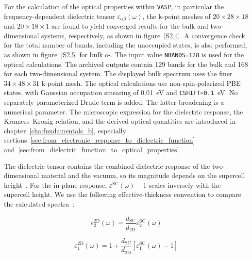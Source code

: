 For the calculation of the optical properties within \texttt{VASP},
in particular the frequency-dependent dielectric tensor $\varepsilon_{\alpha\beta}(\omega)$,
the k-point meshes of $20 \times 28 \times 18$ and $20 \times 18 \times 1$ are found to yield converged results for the bulk and two-dimensional systems,
respectively, as shown in figure~\ref{S2.4}.
A convergence check for the total number of bands, including the unoccupied states, is also performed,
as shown in figure~\ref{S2.5} for bulk o-.
The input value \texttt{NBANDS=128} is used for the optical calculations.
The archived outputs contain 129 bands for the bulk and 168 for each two-dimensional system.
The displayed bulk spectrum uses the finer $34\times48\times31$ k-point mesh.
The optical calculations use non-spin-polarized PBE states,
with Gaussian occupation smearing of \qty{0.01}{\electronvolt} and \texttt{CSHIFT=0.1}~eV.
No separately parameterized Drude term is added.
The latter broadening is a numerical parameter.
The microscopic expression for the dielectric response,
the Kramers--Kronig relation,
and the derived optical quantities are introduced in chapter~\ref{cha:fundamentals_b},
especially sections~\ref{sec:from_electronic_response_to_dielectric_function} and~\ref{sec:from_dielectric_function_to_optical_properties}.

The dielectric tensor contains the combined dielectric response of the two-dimensional material and the vacuum,
so its magnitude depends on the supercell height~\cite{weng2018honeycomb,laturia2018dielectric}.
For the in-plane response, $\varepsilon^{\mathrm{SC}}(\omega)-1$ scales inversely with the supercell height.
We use the following effective-thickness convention to compare the calculated spectra~\cite{yang2021method}:

\begin{equation}
    \varepsilon_{2}^{\mathrm{2D}}(\omega)
    = \frac{d_{\mathrm{SC}}}{d_{\mathrm{2D}}}
    \varepsilon_{2}^{\mathrm{SC}}(\omega)
    \label{dielectric_vacuum_correction_imaginary}
\end{equation}

\begin{equation}
    \varepsilon_{1}^{\mathrm{2D}}(\omega) =
    1 + \frac{d_{\mathrm{SC}}}{d_{\mathrm{2D}}}
    \left[\varepsilon_{1}^{\mathrm{SC}}(\omega)-1\right]
    \label{dielectric_vacuum_correction_real}
\end{equation}

